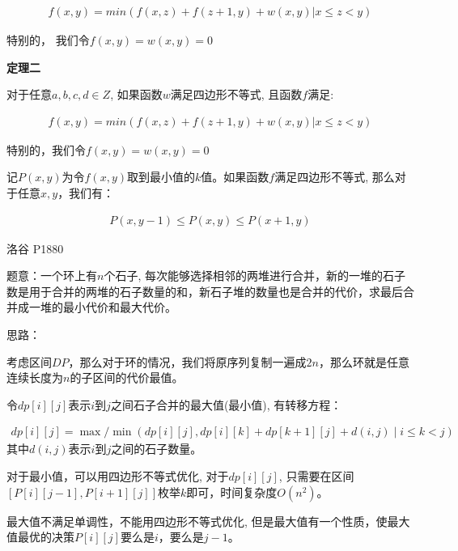\begin{eqnarray*}
f(x,y)=min(f(x,z)+f(z+1,y)+w(x,y)|x\leq z <y)
\end{eqnarray*}

特别的， 我们令$f(x, y) = w(x, y) = 0$\par

\textbf{定理二}\par

对于任意$a, b, c, d \in Z$, 如果函数$w$满足四边形不等式, 且函数$f$满足:

\begin{eqnarray*}
f(x,y)=min(f(x,z)+f(z+1,y)+w(x,y)|x\leq z <y)
\end{eqnarray*}

特别的，我们令$f(x, y) = w(x, y) = 0$\par

记$P(x, y)$为令$f(x, y)$取到最小值的$k$值。如果函数$f$满足四边形不等式, 那么对于任意$x, y$，我们有：

\begin{eqnarray*}
P(x,y-1)\leq P(x,y)\leq P(x+1,y)
\end{eqnarray*}

洛谷 P1880\par

题意：一个环上有$n$个石子, 每次能够选择相邻的两堆进行合并，新的一堆的石子数是用于合并的两堆的石子数量的和，新石子堆的数量也是合并的代价，求最后合并成一堆的最小代价和最大代价。\par

思路：\par

考虑区间$DP$，那么对于环的情况，我们将原序列复制一遍成$2n$，那么环就是任意连续长度为$n$的子区间的代价最值。\par

令$dp[i][j]$表示$i$到$j$之间石子合并的最大值(最小值), 有转移方程：\par

\begin{eqnarray*}
dp[i][j] = \max / \min(dp[i][j],dp[i][k]+dp[k+1][j]+d(i,j)\;|\;i\leq k < j)
\end{eqnarray*}
其中$d(i, j)$表示$i$到$j$之间的石子数量。\par

对于最小值，可以用四边形不等式优化, 对于$dp[i][j]$, 只需要在区间$[P[i][j - 1], P[i + 1][j]]$枚举$k$即可，时间复杂度$O(n^2)$。\par

最大值不满足单调性，不能用四边形不等式优化, 但是最大值有一个性质，使最大值最优的决策$P[i][j]$要么是$i$，要么是$j - 1$。\par


